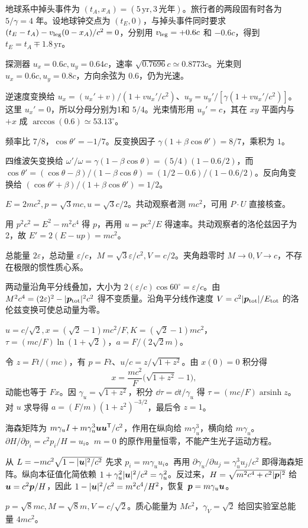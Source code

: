 \begin{bookexercises}
地球系中掉头事件为 $(t_A,x_A)=(5\,\mathrm{yr},3\,\text{光年})$。旅行者的两段固有时各为 $5/\gamma=4$ 年。设地球钟交点为 $(t_E,0)$，与掉头事件同时要求 $(t_E-t_A)-v_{\rm leg}(0-x_A)/c^2=0$，分别用 $v_{\rm leg}=+0.6c$ 和 $-0.6c$，得到 $t_E=t_A\mp1.8\,\mathrm{yr}$。
\item 探测器 $u_x=0.6c,u_y=0.64c$，速率 $\sqrt{0.7696}c\simeq0.8773c$。光束则 $u_x=0.6c,u_y=0.8c$，方向余弦为 $0.6$，仍为光速。

逆速度变换给 $u_x=(u_x'+v)/(1+vu_x'/c^2)$、$u_y=u_y'/[\gamma(1+vu_x'/c^2)]$。这里 $u_x'=0$，所以分母分别为1和 $5/4$。光束情形用 $u_y'=c$，其在 $xy$ 平面内与 $+x$ 成 $\arccos(0.6)\simeq53.13^\circ$。
\item 频率比 $7/8$，$\cos\theta'=-1/7$。反变换因子 $\gamma(1+\beta\cos\theta')=8/7$，乘积为 $1$。

四维波矢变换给 $\omega'/\omega=\gamma(1-\beta\cos\theta)=(5/4)(1-0.6/2)$，而 $\cos\theta'=(\cos\theta-\beta)/(1-\beta\cos\theta)=(1/2-0.6)/(1-0.6/2)$。反向角变换给 $(\cos\theta'+\beta)/(1+\beta\cos\theta')=1/2$。
\item $E=2mc^2,p=\sqrt3mc,u=\sqrt3c/2$。共动观察者测 $mc^2$，可用 $P\cdot U$ 直接核查。

用 $p^2c^2=E^2-m^2c^4$ 得 $p$，再用 $u=pc^2/E$ 得速率。共动观察者的洛伦兹因子为2，故 $E'=2(E-up)=mc^2$。
\item 总能量 $2\varepsilon$，总动量 $\varepsilon/c$，$M=\sqrt3\varepsilon/c^2,V=c/2$。夹角趋零时 $M\to0,V\to c$，不存在极限的惯性质心系。

两动量沿角平分线叠加，大小为 $2(\varepsilon/c)\cos60^\circ=\varepsilon/c$。由 $M^2c^4=(2\varepsilon)^2-|\boldsymbol{p}_{\rm tot}|^2c^2$ 得不变质量。沿角平分线作速度 $V=c^2|\boldsymbol{p}_{\rm tot}|/E_{\rm tot}$ 的洛伦兹变换可使总动量为零。
\item $u=c/\sqrt2,x=(\sqrt2-1)mc^2/F,K=(\sqrt2-1)mc^2$，$\tau=(mc/F)\ln(1+\sqrt2)$，$a=F/(2\sqrt2m)$。

令 $z=Ft/(mc)$，有 $p=Ft$、$u/c=z/\sqrt{1+z^2}$。由 $x(0)=0$ 积分得
\[
x=\frac{mc^2}{F}\bigl(\sqrt{1+z^2}-1\bigr),
\]
动能也等于 $Fx$。因 $\gamma_u=\sqrt{1+z^2}$，积分 $\dd\tau=\dd t/\gamma_u$ 得 $\tau=(mc/F)\operatorname{arsinh}z$。对 $u$ 求导得 $a=(F/m)(1+z^2)^{-3/2}$，最后令 $z=1$。
\item 海森矩阵为 $m\gamma_u I+m\gamma_u^3\boldsymbol{u}\boldsymbol{u}^{\mathsf T}/c^2$，作用在纵向给 $m\gamma_u^3$，横向给 $m\gamma_u$。$\partial H/\partial p_i=c^2p_i/H=u_i$。$m=0$ 的原作用量恒零，不能产生光子运动方程。

从 $L=-mc^2\sqrt{1-|\boldsymbol{u}|^2/c^2}$ 先求 $p_i=m\gamma_u u_i$。再用 $\partial\gamma_u/\partial u_j=\gamma_u^3u_j/c^2$ 即得海森矩阵。纵向本征值化简依赖 $1+\gamma_u^2|\boldsymbol{u}|^2/c^2=\gamma_u^2$。反过来，$H=\sqrt{m^2c^4+c^2|\boldsymbol{p}|^2}$ 给 $\boldsymbol{u}=c^2\boldsymbol{p}/H$，因此 $1-|\boldsymbol{u}|^2/c^2=m^2c^4/H^2$，恢复 $\boldsymbol{p}=m\gamma_u\boldsymbol{u}$。
\item $p=\sqrt8mc,M=\sqrt8m,V=c/\sqrt2$。质心能量为 $Mc^2$，$\gamma_V=\sqrt2$ 给回实验室总能量 $4mc^2$。


\end{bookexercises}
